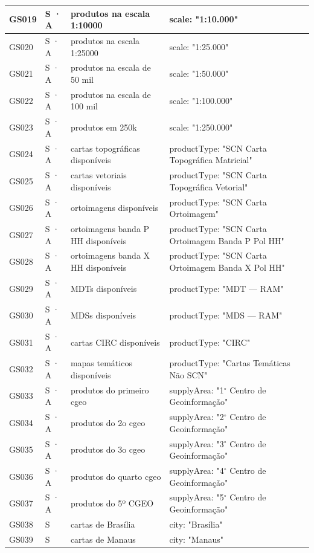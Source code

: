 {\begin{longtable}{|p{1.1cm}|p{1.3cm}|p{5.4cm}|p{6.3cm}|}
GS019 & S · A & produtos na escala 1:10000 & scale: "1:10.000" \\ \hline
GS020 & S · A & produtos na escala 1:25000 & scale: "1:25.000" \\ \hline
GS021 & S · A & produtos na escala de 50 mil & scale: "1:50.000" \\ \hline
GS022 & S · A & produtos na escala de 100 mil & scale: "1:100.000" \\ \hline
GS023 & S · A & produtos em 250k & scale: "1:250.000" \\ \hline
GS024 & S · A & cartas topográficas disponíveis & productType: "SCN Carta Topográfica Matricial" \\ \hline
GS025 & S · A & cartas vetoriais disponíveis & productType: "SCN Carta Topográfica Vetorial" \\ \hline
GS026 & S · A & ortoimagens disponíveis & productType: "SCN Carta Ortoimagem" \\ \hline
GS027 & S · A & ortoimagens banda P HH disponíveis & productType: "SCN Carta Ortoimagem Banda P Pol HH" \\ \hline
GS028 & S · A & ortoimagens banda X HH disponíveis & productType: "SCN Carta Ortoimagem Banda X Pol HH" \\ \hline
GS029 & S · A & MDTs disponíveis & productType: "MDT — RAM" \\ \hline
GS030 & S · A & MDSs disponíveis & productType: "MDS — RAM" \\ \hline
GS031 & S · A & cartas CIRC disponíveis & productType: "CIRC" \\ \hline
GS032 & S · A & mapas temáticos disponíveis & productType: "Cartas Temáticas Não SCN" \\ \hline
GS033 & S · A & produtos do primeiro cgeo & supplyArea: "1$^\circ$ Centro de Geoinformação" \\ \hline
GS034 & S · A & produtos do 2o cgeo & supplyArea: "2$^\circ$ Centro de Geoinformação" \\ \hline
GS035 & S · A & produtos do 3o cgeo & supplyArea: "3$^\circ$ Centro de Geoinformação" \\ \hline
GS036 & S · A & produtos do quarto cgeo & supplyArea: "4$^\circ$ Centro de Geoinformação" \\ \hline
GS037 & S · A & produtos do 5º CGEO & supplyArea: "5$^\circ$ Centro de Geoinformação" \\ \hline
GS038 & S & cartas de Brasília & city: "Brasília" \\ \hline
GS039 & S & cartas de Manaus & city: "Manaus" \\ \hline

\end{longtable}}
